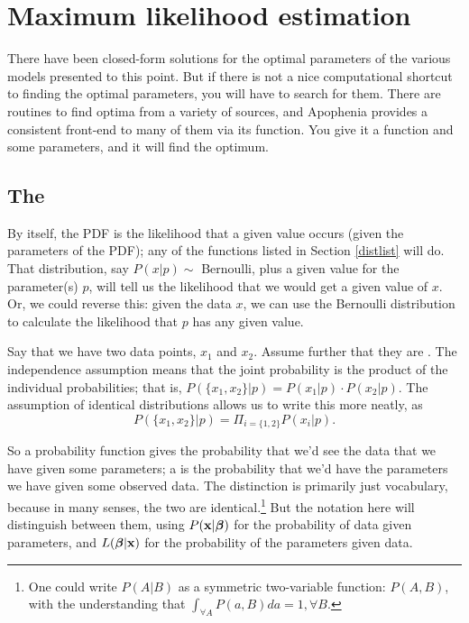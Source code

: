 \chapter{Maximum likelihood estimation} \label{mle}

There have been  
closed-form solutions for the optimal parameters of the various models
presented to this point. 
 But if there is not a nice
computational shortcut to finding the optimal parameters, you will have
to search for them. There are routines to find optima from a variety
of sources, and Apophenia provides a consistent front-end to many of
them via its  function. You give it a
function and some parameters, and it will find the optimum.

\section{The }	\label{the score}
By itself, the PDF is the likelihood that a given value occurs (given
the parameters of the PDF); any of the functions listed in Section
\ref{distlist} will do. That distribution, say $P(x|p)\sim$ Bernoulli,
plus a given value for the parameter(s) $p$, will tell us the likelihood
that we would get a given value of $x$. Or, we could reverse this:
given the data $x$, we can use the Bernoulli distribution to calculate the
likelihood that $p$ has any given value.

Say that we have two data points, $x_1$ and $x_2$. Assume further that
they are .  The independence assumption 
means that the joint probability is the product of the individual
probabilities; that is, $P(\{x_1,x_2\}|p)=P(x_1|p)\cdot P(x_2|p)$.
The assumption of identical distributions allows us to write this more
neatly, as $$P(\{x_1,x_2\}|p)=\Pi_{i=\{1,2\}}P(x_i|p).$$


So a probability function gives the probability that we'd see the data
that we have given some parameters; a 
is the probability that we'd have the parameters we have given some
observed data. The distinction is primarily just vocabulary, because in
many senses, the two are identical.\footnote{One could write $P(A|B)$
as a symmetric two-variable function: $P(A,B)$, with the understanding
that $\int_{\forall A} P(a,B)da = 1, \forall B$.} But the notation here
will distinguish between them, using $P({\bf x}|{\mbox{\boldmath$\beta$}})$ for the probability
of data given parameters, and $L({\mbox{\boldmath$\beta$}}|{\bf x})$ for the probability of the
parameters given data.

